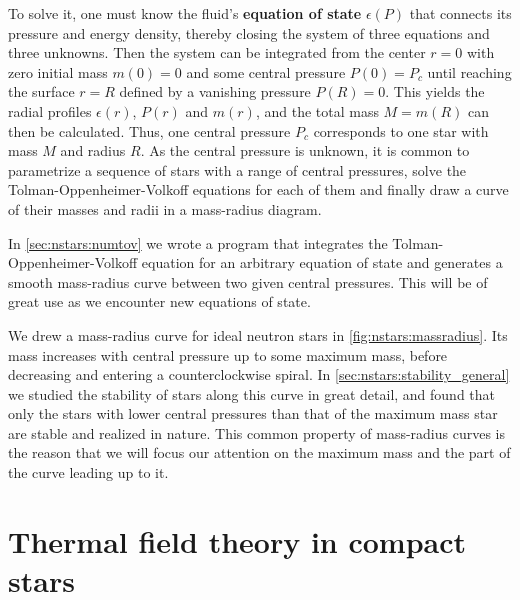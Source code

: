 To solve it, one must know the fluid's \textbf{equation of state} $\epsilon(P)$ that connects its pressure and energy density, thereby closing the system of three equations and three unknowns.
Then the system can be integrated from the center $r=0$ with zero initial mass $m(0) = 0$ and some central pressure $P(0) = P_c$ until reaching the surface $r=R$ defined by a vanishing pressure $P(R) = 0$.
This yields the radial profiles $\epsilon(r)$, $P(r)$ and $m(r)$, and the total mass $M = m(R)$ can then be calculated.
Thus, one central pressure $P_c$ corresponds to one star with mass $M$ and radius $R$.
As the central pressure is unknown,
it is common to parametrize a sequence of stars with a range of central pressures,
solve the Tolman-Oppenheimer-Volkoff equations for each of them and finally draw a curve of their masses and radii in a mass-radius diagram.

In \cref{sec:nstars:numtov} we wrote a program that integrates the Tolman-Oppenheimer-Volkoff equation for an arbitrary equation of state and generates a smooth mass-radius curve between two given central pressures.
This will be of great use as we encounter new equations of state.

We drew a mass-radius curve for ideal neutron stars in \cref{fig:nstars:massradius}.
Its mass increases with central pressure up to some maximum mass, before decreasing and entering a counterclockwise spiral.
In \cref{sec:nstars:stability_general} we studied the stability of stars along this curve in great detail,
and found that only the stars with lower central pressures than that of the maximum mass star are stable and realized in nature.
This common property of mass-radius curves is the reason that we will focus our attention on the maximum mass and the part of the curve leading up to it.

\section{Thermal field theory in compact stars}
\label{sec:master_intro:tft}

